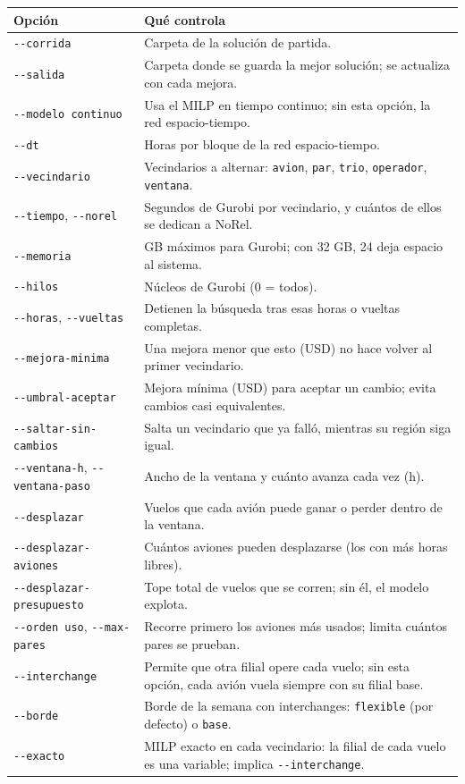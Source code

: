 \documentclass[11pt,a4paper]{article}
\begin{document}
\begin{table}[h]
\centering
\small
\begin{tabularx}{\textwidth}{lX}
\toprule
Opción & Qué controla \\
\midrule
\texttt{-{}-corrida} & Carpeta de la solución de partida. \\
\texttt{-{}-salida} & Carpeta donde se guarda la mejor solución; se actualiza con cada mejora. \\
\texttt{-{}-modelo continuo} & Usa el MILP en tiempo continuo; sin esta opción, la red espacio-tiempo. \\
\texttt{-{}-dt} & Horas por bloque de la red espacio-tiempo. \\
\texttt{-{}-vecindario} & Vecindarios a alternar: \texttt{avion}, \texttt{par}, \texttt{trio}, \texttt{operador}, \texttt{ventana}. \\
\texttt{-{}-tiempo}, \texttt{-{}-norel} & Segundos de Gurobi por vecindario, y cuántos de ellos se dedican a NoRel. \\
\texttt{-{}-memoria} & GB máximos para Gurobi; con 32 GB, 24 deja espacio al sistema. \\
\texttt{-{}-hilos} & Núcleos de Gurobi (0 = todos). \\
\texttt{-{}-horas}, \texttt{-{}-vueltas} & Detienen la búsqueda tras esas horas o vueltas completas. \\
\texttt{-{}-mejora-minima} & Una mejora menor que esto (USD) no hace volver al primer vecindario. \\
\texttt{-{}-umbral-aceptar} & Mejora mínima (USD) para aceptar un cambio; evita cambios casi equivalentes. \\
\texttt{-{}-saltar-sin-cambios} & Salta un vecindario que ya falló, mientras su región siga igual. \\
\texttt{-{}-ventana-h}, \texttt{-{}-ventana-paso} & Ancho de la ventana y cuánto avanza cada vez (h). \\
\texttt{-{}-desplazar} & Vuelos que cada avión puede ganar o perder dentro de la ventana. \\
\texttt{-{}-desplazar-aviones} & Cuántos aviones pueden desplazarse (los con más horas libres). \\
\texttt{-{}-desplazar-presupuesto} & Tope total de vuelos que se corren; sin él, el modelo explota. \\
\texttt{-{}-orden uso}, \texttt{-{}-max-pares} & Recorre primero los aviones más usados; limita cuántos pares se prueban. \\
\texttt{-{}-interchange} & Permite que otra filial opere cada vuelo; sin esta opción, cada avión vuela siempre con su filial base. \\
\texttt{-{}-borde} & Borde de la semana con interchanges: \texttt{flexible} (por defecto) o \texttt{base}. \\
\texttt{-{}-exacto} & MILP exacto en cada vecindario: la filial de cada vuelo es una variable; implica \texttt{-{}-interchange}. \\
\bottomrule
\end{tabularx}
\end{table}
\end{document}
